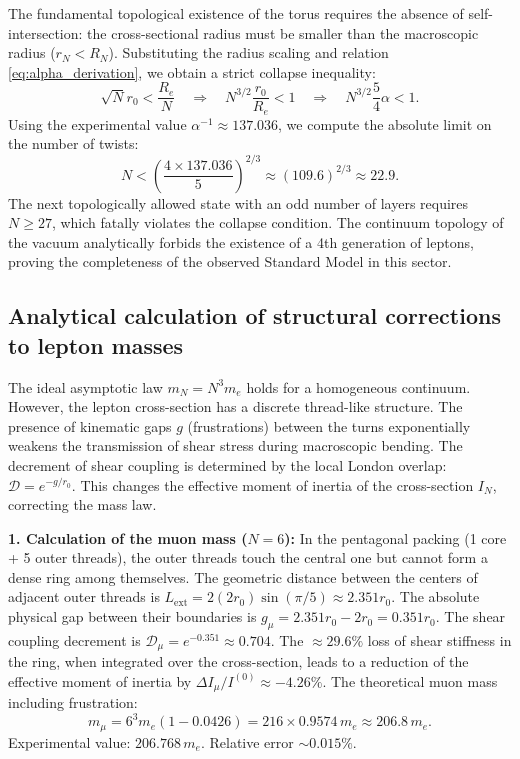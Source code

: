 \documentclass[11pt,a4paper]{article}
\begin{document}
The fundamental topological existence of the torus requires the absence of self-intersection: the cross-sectional radius must be smaller than the macroscopic radius ($r_N < R_N$). Substituting the radius scaling and relation \eqref{eq:alpha_derivation}, we obtain a strict collapse inequality:
\begin{equation}
\sqrt{N} r_0 < \frac{R_e}{N} \quad \Longrightarrow \quad N^{3/2} \frac{r_0}{R_e} < 1 \quad \Longrightarrow \quad N^{3/2} \frac{5}{4}\alpha < 1.
\end{equation}
Using the experimental value $\alpha^{-1} \approx 137.036$, we compute the absolute limit on the number of twists:
\begin{equation}
N < \left( \frac{4 \times 137.036}{5} \right)^{2/3} \approx (109.6)^{2/3} \approx 22.9.
\end{equation}
The next topologically allowed state with an odd number of layers requires $N \ge 27$, which fatally violates the collapse condition. The continuum topology of the vacuum analytically forbids the existence of a 4th generation of leptons, proving the completeness of the observed Standard Model in this sector.
	
\subsection{Analytical calculation of structural corrections to lepton masses}
The ideal asymptotic law $m_N = N^3 m_e$ holds for a homogeneous continuum. However, the lepton cross-section has a discrete thread-like structure. The presence of kinematic gaps $g$ (frustrations) between the turns exponentially weakens the transmission of shear stress during macroscopic bending. The decrement of shear coupling is determined by the local London overlap: $\mathcal{D} = e^{-g / r_0}$. This changes the effective moment of inertia of the cross-section $I_N$, correcting the mass law.
	
\textbf{1. Calculation of the muon mass ($N=6$):} 
In the pentagonal packing (1 core + 5 outer threads), the outer threads touch the central one but cannot form a dense ring among themselves. The geometric distance between the centers of adjacent outer threads is $L_{\text{ext}} = 2(2r_0) \sin(\pi/5) \approx 2.351 r_0$. The absolute physical gap between their boundaries is $g_\mu = 2.351 r_0 - 2 r_0 = 0.351 r_0$. 
The shear coupling decrement is $\mathcal{D}_\mu = e^{-0.351} \approx 0.704$. 
The $\approx 29.6\%$ loss of shear stiffness in the ring, when integrated over the cross-section, leads to a reduction of the effective moment of inertia by $\Delta I_\mu / I^{(0)} \approx -4.26\%$. 
The theoretical muon mass including frustration:
\begin{equation}
m_\mu = 6^3 m_e (1 - 0.0426) = 216 \times 0.9574 \, m_e \approx 206.8 \, m_e.
\end{equation}
Experimental value: $206.768 \, m_e$. Relative error $\sim 0.015\%$.
	
\end{document}

